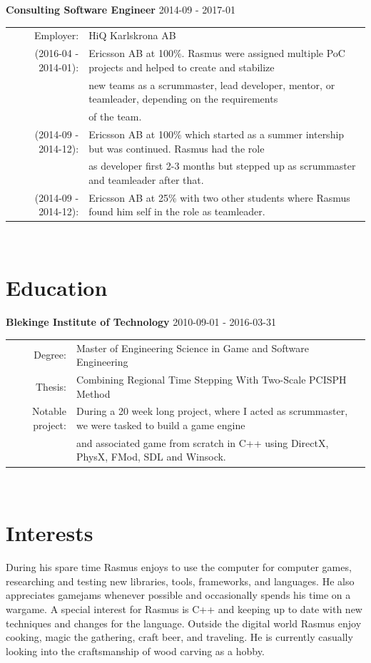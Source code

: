 \documentclass[a4paper,10pt]{article}
\begin{document}
\textbf{Consulting Software Engineer} 2014-09 - 2017-01 \\
\begin{tabular}{rl}
Employer:& HiQ Karlskrona AB\\
(2016-04 - 2014-01):& Ericsson AB at 100\%. Rasmus were assigned multiple PoC projects and helped to create and stabilize\\& new teams as a scrummaster, lead developer, mentor, or teamleader, depending on the requirements\\& of the team. \\
(2014-09 - 2014-12):& Ericsson AB at 100\% which started as a summer intership but was continued. Rasmus had the role\\& as developer first 2-3 months but stepped up as scrummaster and teamleader after that. \\
(2014-09 - 2014-12):& Ericsson AB at 25\% with two other students where Rasmus found him self in the role as teamleader.\\

\end{tabular}\\

\section{Education}
\textbf{Blekinge Institute of Technology} 2010-09-01 - 2016-03-31\\
\begin{tabular}{rl}
Degree:&  Master of Engineering Science in Game and Software Engineering\\
Thesis:& Combining Regional Time Stepping With Two-Scale PCISPH Method\\
Notable project:& During a 20 week long project, where I acted as scrummaster, we were tasked to build  a game engine\\& and associated game from scratch in C++ using DirectX, PhysX, FMod, SDL and Winsock.
\end{tabular}\\

\section{Interests}
During his spare time Rasmus enjoys to use the computer for computer games, researching and testing new libraries, tools, frameworks, and languages. He also appreciates gamejams whenever possible and occasionally spends his time on a wargame. A special interest for Rasmus is C++ and keeping up to date with new techniques and changes for the language. Outside the digital world Rasmus enjoy cooking, magic the gathering, craft beer, and traveling. He is currently casually looking into the craftsmanship of wood carving as a hobby.
\end{document}
